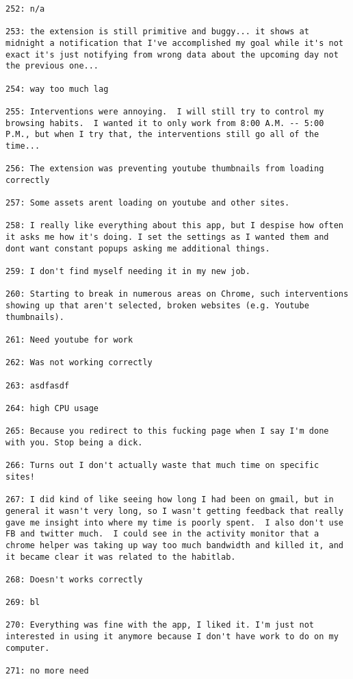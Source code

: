 \begin{lstlisting}[breaklines]
252: n/a

253: the extension is still primitive and buggy... it shows at midnight a notification that I've accomplished my goal while it's not exact it's just notifying from wrong data about the upcoming day not the previous one...

254: way too much lag

255: Interventions were annoying.  I will still try to control my browsing habits.  I wanted it to only work from 8:00 A.M. -- 5:00 P.M., but when I try that, the interventions still go all of the time...

256: The extension was preventing youtube thumbnails from loading correctly

257: Some assets arent loading on youtube and other sites.

258: I really like everything about this app, but I despise how often it asks me how it's doing. I set the settings as I wanted them and dont want constant popups asking me additional things.

259: I don't find myself needing it in my new job.

260: Starting to break in numerous areas on Chrome, such interventions showing up that aren't selected, broken websites (e.g. Youtube thumbnails).

261: Need youtube for work

262: Was not working correctly

263: asdfasdf

264: high CPU usage

265: Because you redirect to this fucking page when I say I'm done with you. Stop being a dick.

266: Turns out I don't actually waste that much time on specific sites!

267: I did kind of like seeing how long I had been on gmail, but in general it wasn't very long, so I wasn't getting feedback that really gave me insight into where my time is poorly spent.  I also don't use FB and twitter much.  I could see in the activity monitor that a chrome helper was taking up way too much bandwidth and killed it, and it became clear it was related to the habitlab.

268: Doesn't works correctly

269: bl

270: Everything was fine with the app, I liked it. I'm just not interested in using it anymore because I don't have work to do on my computer.

271: no more need


\end{lstlisting}
